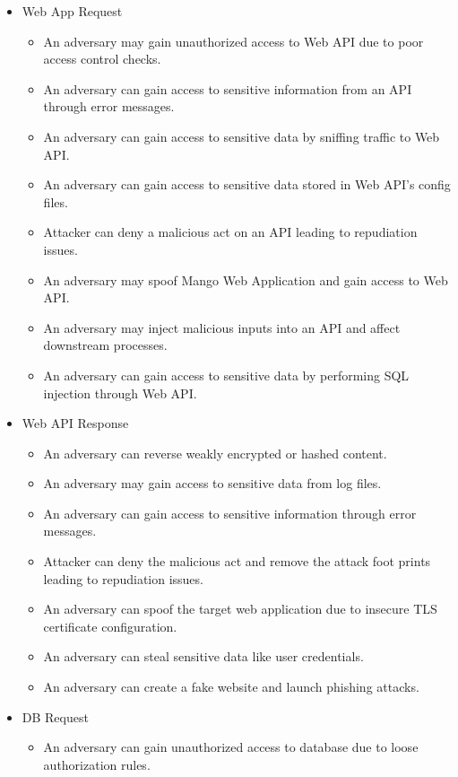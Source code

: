 \begin{itemize}
    \item Web App Request
    \begin{itemize}
        \item An adversary may gain unauthorized access to Web API due to poor access control checks.
        \item An adversary can gain access to sensitive information from an API through error messages.
        \item An adversary can gain access to sensitive data by sniffing traffic to Web API.
        \item An adversary can gain access to sensitive data stored in Web API's config files.
        \item Attacker can deny a malicious act on an API leading to repudiation issues.
        \item An adversary may spoof Mango Web Application and gain access to Web API.
        \item An adversary may inject malicious inputs into an API and affect downstream processes.
        \item An adversary can gain access to sensitive data by performing SQL injection through Web API\@.
    \end{itemize}
    \item Web API Response
    \begin{itemize}
        \item An adversary can reverse weakly encrypted or hashed content.
        \item An adversary may gain access to sensitive data from log files.
        \item An adversary can gain access to sensitive information through error messages.
        \item Attacker can deny the malicious act and remove the attack foot prints leading to repudiation issues.
        \item An adversary can spoof the target web application due to insecure TLS certificate configuration.
        \item An adversary can steal sensitive data like user credentials.
        \item An adversary can create a fake website and launch phishing attacks.
    \end{itemize}
    \item DB Request
    \begin{itemize}
        \item An adversary can gain unauthorized access to database due to loose authorization rules.

\end{itemize}
\end{itemize}
